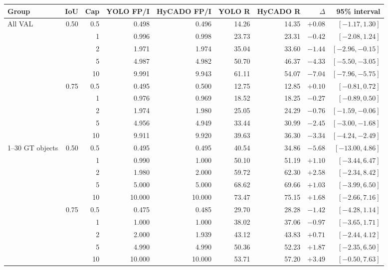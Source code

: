\begin{tabular}{lrrrrrrrr}
\toprule
Group & IoU & Cap & YOLO FP/I & HyCADO FP/I & YOLO R & HyCADO R & $\Delta$ & 95\% interval\\
\midrule
All VAL & 0.50 & 0.5 & 0.498 & 0.496 & 14.26 & 14.35 & $+0.08$ & $[-1.17, 1.30]$\\
 &  & 1 & 0.996 & 0.998 & 23.73 & 23.31 & $-0.42$ & $[-2.08, 1.24]$\\
 &  & 2 & 1.971 & 1.974 & 35.04 & 33.60 & $-1.44$ & $[-2.96, -0.15]$\\
 &  & 5 & 4.987 & 4.982 & 50.70 & 46.37 & $-4.33$ & $[-5.50, -3.05]$\\
 &  & 10 & 9.991 & 9.943 & 61.11 & 54.07 & $-7.04$ & $[-7.96, -5.75]$\\
 & 0.75 & 0.5 & 0.495 & 0.500 & 12.75 & 12.85 & $+0.10$ & $[-0.81, 0.72]$\\
 &  & 1 & 0.976 & 0.969 & 18.52 & 18.25 & $-0.27$ & $[-0.89, 0.50]$\\
 &  & 2 & 1.974 & 1.980 & 25.05 & 24.29 & $-0.76$ & $[-1.59, -0.06]$\\
 &  & 5 & 4.956 & 4.949 & 33.44 & 30.99 & $-2.45$ & $[-3.00, -1.68]$\\
 &  & 10 & 9.911 & 9.920 & 39.63 & 36.30 & $-3.34$ & $[-4.24, -2.49]$\\
1--30 GT objects & 0.50 & 0.5 & 0.495 & 0.495 & 40.54 & 34.86 & $-5.68$ & $[-13.00, 4.86]$\\
 &  & 1 & 0.990 & 1.000 & 50.10 & 51.19 & $+1.10$ & $[-3.44, 6.47]$\\
 &  & 2 & 1.980 & 2.000 & 59.72 & 62.30 & $+2.58$ & $[-2.34, 8.42]$\\
 &  & 5 & 5.000 & 5.000 & 68.62 & 69.66 & $+1.03$ & $[-3.99, 6.50]$\\
 &  & 10 & 10.000 & 10.000 & 73.47 & 75.15 & $+1.68$ & $[-2.66, 7.16]$\\
 & 0.75 & 0.5 & 0.475 & 0.485 & 29.70 & 28.28 & $-1.42$ & $[-4.28, 1.14]$\\
 &  & 1 & 1.000 & 1.000 & 38.02 & 37.06 & $-0.97$ & $[-3.65, 1.71]$\\
 &  & 2 & 2.000 & 1.939 & 43.12 & 43.83 & $+0.71$ & $[-2.44, 4.12]$\\
 &  & 5 & 4.990 & 4.990 & 50.36 & 52.23 & $+1.87$ & $[-2.35, 6.50]$\\
 &  & 10 & 10.000 & 10.000 & 53.71 & 57.20 & $+3.49$ & $[-0.50, 7.63]$\\
\bottomrule
\end{tabular}
